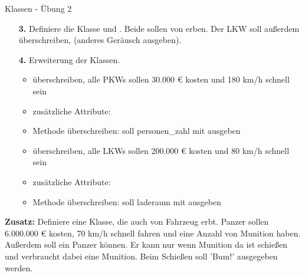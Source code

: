 \begin{frame}{Klassen - Übung 2}
	\begin{itemize}
		\item[\textbf{3.}] 
		Definiere die Klasse  und . Beide sollen von  erben.
		Der LKW soll außerdem  überschreiben, (anderes Geräusch ausgeben).
		
		\item[\textbf{4.}] 
			Erweiterung der Klassen.\linebreak
			\begin{itemize}
				\item {} überschreiben, alle PKWs sollen 30.000 € kosten und 180 km/h schnell sein
				\item zusätzliche Attribute: 
				\item {} Methode überschreiben: soll personen\_zahl mit ausgeben
			\end{itemize}
		
			\begin{itemize}
				\item {} überschreiben, alle LKWs sollen 200.000 € kosten und 80 km/h schnell sein
				\item zusätzliche Attribute: 
				\item {} Methode überschreiben: soll laderaum mit ausgeben
			\end{itemize}
	\end{itemize}
\end{frame}

\begin{frame}
	\textbf{Zusatz:} Definiere eine  Klasse, die auch von Fahrzeug erbt. Panzer sollen 6.000.000 € kosten, 70 km/h schnell fahren und eine Anzahl von Munition haben. Außerdem soll ein Panzer  können. Er kann nur wenn Munition da ist schießen und verbraucht dabei eine Munition. Beim Schießen soll 'Bum!' ausgegeben werden.
\end{frame}


